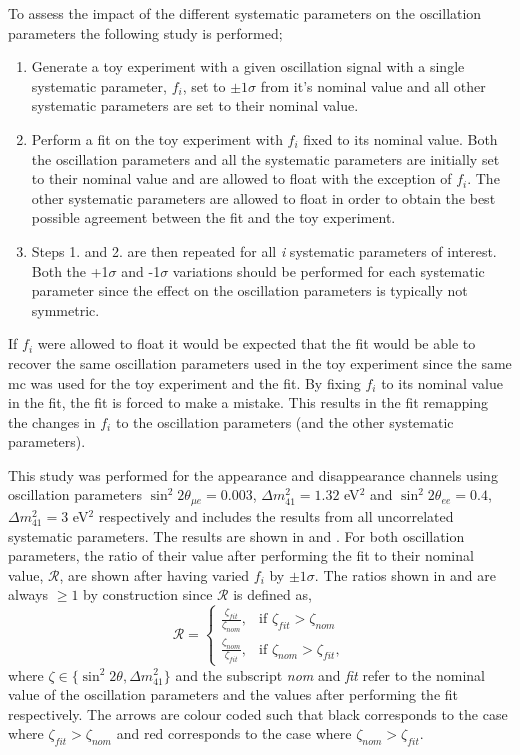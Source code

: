 To assess the impact of the different systematic parameters on the oscillation parameters the following study is performed;
\begin{enumerate}
    \item Generate a toy experiment with a given oscillation signal with a single systematic parameter, $f_i$, set to $\pm1\sigma$ from it's nominal value and all other systematic parameters are set to their nominal value.
    \item Perform a fit on the toy experiment with $f_i$ fixed to its nominal value. Both the oscillation parameters and all the systematic parameters are initially set to their nominal value and are allowed to float with the exception of $f_i$. The other systematic parameters are allowed to float in order to obtain the best possible agreement between the fit and the toy experiment.
    \item Steps 1. and 2. are then repeated for all \textit{i} systematic parameters of interest. Both the +1$\sigma$ and -1$\sigma$ variations should be performed for each systematic parameter since the effect on the oscillation parameters is typically not symmetric.  
\end{enumerate}
If $f_i$ were allowed to float it would be expected that the fit would be able to recover the same oscillation parameters used in the toy experiment since the same \gls{mc} was used for the toy experiment and the fit. By fixing $f_i$ to its nominal value in the fit, the fit is forced to make a mistake. This results in the fit remapping the changes in $f_i$ to the oscillation parameters (and the other systematic parameters). 

This study was performed for the \nue appearance and disappearance channels using oscillation parameters $\sin^2{2\theta}_{\mu e} = 0.003$, 
$\Delta m^2_{41} = 1.32$ eV$^2$ and 
$\sin^2{2\theta}_{ee} = 0.4$, $\Delta m^2_{41} = 3$ eV$^2$ respectively and includes the results from all uncorrelated systematic parameters. The results are shown in  and . For both oscillation parameters, the ratio of their value after performing the fit to their nominal value, $\mathcal{R}$, are shown after having varied $f_i$ by $\pm 1 \sigma$. The ratios shown in  and  are always $\geq 1$ by construction since $\mathcal{R}$ is defined as,
\begin{equation}
    \mathcal{R} = \begin{cases}
    \frac{\zeta_{fit}}{\zeta_{nom}}, & \text{if } \zeta_{fit} > \zeta_{nom} \\
    \frac{\zeta_{nom}}{\zeta_{fit}}, &\text{if } \zeta_{nom} > \zeta_{fit},
    \end{cases}
\end{equation}
where $\zeta \in \{\sin^2{2\theta}, \Delta m^2_{41}\}$ and the subscript \textit{nom} and \textit{fit} refer to the nominal value of the oscillation parameters and the values after performing the fit respectively. The arrows are colour coded such that black corresponds to the case where $\zeta_{fit} > \zeta_{nom}$ and red corresponds to the case where $\zeta_{nom} > \zeta_{fit}$.

